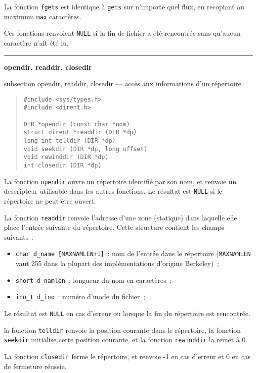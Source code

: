 \documentclass [twoside] {report}
\newcommand {\primitive} [1]
    {
	{\large \bf #1}
	\addcontentsline {toc} {subsection} {#1}
    }
\newcommand {\separation}
    {
	\vspace {7mm}
	\nopagebreak
	\hrule
    }
\begin{document}
La fonction {\tt fgets} est identique à {\tt gets} sur n'importe
quel flux, en recopiant au maximum {\tt max} caractères.

Ces fonctions renvoient {\tt NULL} si la fin de fichier a été
rencontrée sans qu'aucun caractère n'ait été lu.


\separation
\primitive {opendir, readdir, closedir} --- accès aux informations d'un répertoire

\begin {quote}
\begin {verbatim}
#include <sys/types.h>
#include <dirent.h>

DIR *opendir (const char *nom)
struct dirent *readdir (DIR *dp)
long int telldir (DIR *dp)
void seekdir (DIR *dp, long offset)
void rewinddir (DIR *dp)
int closedir (DIR *dp)
\end{verbatim}
\end {quote}

La fonction {\tt opendir} ouvre un répertoire identifié par son nom, et
renvoie un descripteur utilisable dans les autres fonctions. Le résultat
est {\tt NULL} si le répertoire ne peut être ouvert.

La fonction {\tt readdir} renvoie l'adresse d'une zone (statique) dans
laquelle elle place l'entrée suivante du répertoire. Cette structure
contient les champs suivants~:

\begin {itemize}
    \item {\tt char d\_name [MAXNAMLEN+1]}~: nom de l'entrée dans le
	répertoire ({\tt MAXNAMLEN} vaut 255 dans la plupart des
	implémentations d'origine Berkeley)~;
    \item {\tt short d\_namlen}~: longueur du nom en caractères~;
    \item {\tt ino\_t d\_ino}~: numéro d'inode du fichier~;
\end {itemize}

Le résultat est {\tt NULL} en cas d'erreur ou lorsque la fin du
répertoire est rencontrée.

la fonction {\tt telldir} renvoie la position courante dans le
répertoire, la fonction {\tt seekdir} initialise cette position
courante, et la fonction {\tt rewinddir} la remet à 0.

La fonction {\tt closedir} ferme le répertoire, et renvoie -1 en cas
d'erreur et 0 en cas de fermeture réussie.
\end{document}

